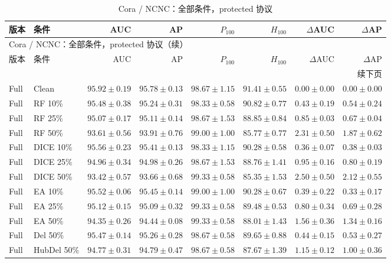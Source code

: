 {\footnotesize
\setlength{\tabcolsep}{3.2pt}
\renewcommand{\arraystretch}{1.10}
\begin{longtable}{llrrrrrr}
\caption{Cora / NCNC：全部条件，protected 协议}\\
\toprule
版本 & 条件 & AUC & AP & $P_{100}$ & $H_{100}$ & $\Delta$AUC & $\Delta$AP \\
\midrule
\endfirsthead
\multicolumn{8}{l}{Cora / NCNC：全部条件，protected 协议（续）}\\
\toprule
版本 & 条件 & AUC & AP & $P_{100}$ & $H_{100}$ & $\Delta$AUC & $\Delta$AP \\
\midrule
\endhead
\midrule\multicolumn{8}{r}{续下页}\\
\endfoot
\bottomrule
\endlastfoot
Full & Clean & $95.92\pm0.19$ & $95.78\pm0.13$ & $98.67\pm1.15$ & $91.41\pm0.55$ & $0.00\pm0.00$ & $0.00\pm0.00$ \\
Full & RF 10\% & $95.48\pm0.38$ & $95.24\pm0.31$ & $98.33\pm0.58$ & $90.82\pm0.77$ & $0.43\pm0.19$ & $0.54\pm0.24$ \\
Full & RF 25\% & $95.07\pm0.17$ & $95.11\pm0.14$ & $98.67\pm1.53$ & $88.85\pm0.84$ & $0.85\pm0.03$ & $0.67\pm0.04$ \\
Full & RF 50\% & $93.61\pm0.56$ & $93.91\pm0.76$ & $99.00\pm1.00$ & $85.77\pm0.77$ & $2.31\pm0.50$ & $1.87\pm0.62$ \\
Full & DICE 10\% & $95.56\pm0.23$ & $95.41\pm0.13$ & $98.33\pm1.15$ & $90.28\pm0.58$ & $0.36\pm0.07$ & $0.38\pm0.03$ \\
Full & DICE 25\% & $94.96\pm0.34$ & $94.98\pm0.26$ & $98.67\pm1.53$ & $88.76\pm1.41$ & $0.95\pm0.16$ & $0.80\pm0.19$ \\
Full & DICE 50\% & $93.42\pm0.57$ & $93.66\pm0.68$ & $99.33\pm0.58$ & $85.35\pm1.53$ & $2.50\pm0.50$ & $2.12\pm0.55$ \\
Full & EA 10\% & $95.52\pm0.06$ & $95.45\pm0.14$ & $99.00\pm1.00$ & $90.28\pm0.67$ & $0.39\pm0.22$ & $0.33\pm0.17$ \\
Full & EA 25\% & $95.12\pm0.15$ & $95.09\pm0.32$ & $99.33\pm0.58$ & $89.48\pm0.53$ & $0.80\pm0.34$ & $0.69\pm0.28$ \\
Full & EA 50\% & $94.35\pm0.26$ & $94.44\pm0.08$ & $99.33\pm0.58$ & $88.01\pm1.43$ & $1.56\pm0.36$ & $1.34\pm0.16$ \\
Full & Del 50\% & $95.47\pm0.14$ & $95.26\pm0.28$ & $98.67\pm0.58$ & $89.65\pm0.88$ & $0.44\pm0.15$ & $0.53\pm0.27$ \\
Full & HubDel 50\% & $94.77\pm0.31$ & $94.79\pm0.47$ & $98.67\pm0.58$ & $87.67\pm1.39$ & $1.15\pm0.12$ & $1.00\pm0.36$ \\

\end{longtable}}
